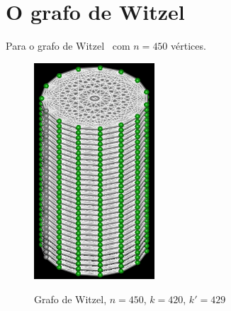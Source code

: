\section{O grafo de Witzel}
Para o grafo de Witzel~\cite{cite:example-witzel} com $n=450$
vértices.

\begin{figure}[htb]
\centering
\includegraphics[width=0.4\textwidth]{img/witzel.png}
\label{fig:example-witzel}
\caption{Grafo de Witzel, $n=450$, $k=420$, $k'=429$}
\end{figure}

